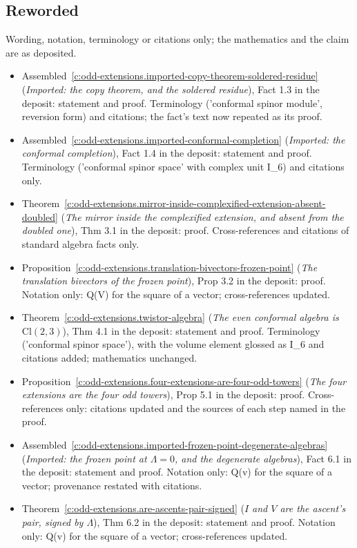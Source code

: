 \documentclass[11pt]{article}
\theoremstyle{definition}
\theoremstyle{plain}
\providecommand{\Cl}{}\renewcommand{\Cl}{\mathrm{Cl}}
\begin{document}
\subsection*{Reworded}
Wording, notation, terminology or citations only; the mathematics and the claim are as deposited.
\begin{itemize}\setlength{\itemsep}{2pt}
\item Assembled~\ref{c:odd-extensions.imported-copy-theorem-soldered-residue} (\emph{Imported: the copy theorem, and the soldered residue}), Fact 1.3 in the deposit: statement and proof. Terminology ('conformal spinor module', reversion form) and citations; the fact's text now repeated as its proof.
\item Assembled~\ref{c:odd-extensions.imported-conformal-completion} (\emph{Imported: the conformal completion}), Fact 1.4 in the deposit: statement and proof. Terminology ('conformal spinor space' with complex unit I\_6) and citations only.
\item Theorem~\ref{c:odd-extensions.mirror-inside-complexified-extension-absent-doubled} (\emph{The mirror inside the complexified extension, and absent from the doubled one}), Thm 3.1 in the deposit: proof. Cross-references and citations of standard algebra facts only.
\item Proposition~\ref{c:odd-extensions.translation-bivectors-frozen-point} (\emph{The translation bivectors of the frozen point}), Prop 3.2 in the deposit: proof. Notation only: Q(V) for the square of a vector; cross-references updated.
\item Theorem~\ref{c:odd-extensions.twistor-algebra} (\emph{The even conformal algebra is $\Cl(2,3)$}), Thm 4.1 in the deposit: statement and proof. Terminology ('conformal spinor space'), with the volume element glossed as I\_6 and citations added; mathematics unchanged.
\item Proposition~\ref{c:odd-extensions.four-extensions-are-four-odd-towers} (\emph{The four extensions are the four odd towers}), Prop 5.1 in the deposit: proof. Cross-references only: citations updated and the sources of each step named in the proof.
\item Assembled~\ref{c:odd-extensions.imported-frozen-point-degenerate-algebras} (\emph{Imported: the frozen point at $\Lambda = 0$, and the degenerate algebras}), Fact 6.1 in the deposit: statement and proof. Notation only: Q(v) for the square of a vector; provenance restated with citations.
\item Theorem~\ref{c:odd-extensions.are-ascents-pair-signed} (\emph{$I$ and $V$ are the ascent's pair, signed by $\Lambda$}), Thm 6.2 in the deposit: statement and proof. Notation only: Q(v) for the square of a vector; cross-references updated.

\end{itemize}
\end{document}
